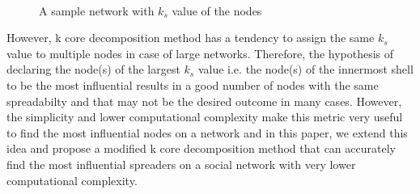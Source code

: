 \documentclass[sigconf]{acmart}
\newcommand{\graphicsplaceholder}[2]{%
	\begin{tcolorbox}[valign=center,width=#1,height=#2,arc=0.5mm,auto outer arc]%
		\centering%
		\sf missing graphic%
	\end{tcolorbox}%
}
\begin{document}
\begin{itemize}
	\begin{figure}[htpb]
		\centering
		\\
		\caption{A sample network with $k_s$ value of the nodes}
		\label{k core}
	\end{figure}
	However, k core decomposition method has a tendency to assign the same $k_s$ value to multiple nodes in case of large networks. Therefore, the hypothesis of declaring the node(s) of the largest $k_s$ value i.e. the node(s) of the innermost shell to be the most influential results in a good number of nodes with the same spreadabilty and that may not be the desired outcome in many cases. However, the simplicity and lower computational complexity make this metric very useful to find the most influential nodes on a network and in this paper, we extend this idea and propose a modified k core decomposition method that can accurately find the most influential spreaders on a social network with very lower computational complexity.
\end{itemize}
\end{document}
